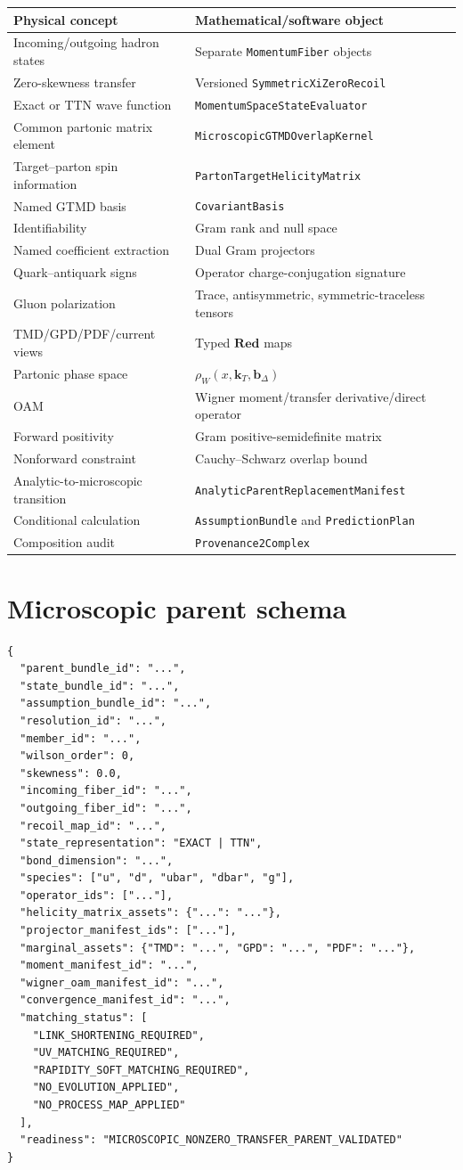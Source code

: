 \documentclass[11pt]{article}
\newcommand{\kT}{\bm{k}_{T}}
\newcommand{\bD}{\bm{b}_{\Delta}}
\newcommand{\AssumptionBundle}{\texttt{AssumptionBundle}}
\newcommand{\PredictionPlan}{\texttt{PredictionPlan}}
\newcommand{\MomentumFiber}{\texttt{MomentumFiber}}
\newcommand{\RecoilMap}{\texttt{SymmetricXiZeroRecoil}}
\newcommand{\StateEvaluator}{\texttt{MomentumSpaceStateEvaluator}}
\newcommand{\OverlapKernel}{\texttt{MicroscopicGTMDOverlapKernel}}
\newcommand{\HelicityMatrix}{\texttt{PartonTargetHelicityMatrix}}
\newcommand{\ReplacementManifest}{\texttt{AnalyticParentReplacementManifest}}
\newcommand{\ProvComplex}{\texttt{Provenance2Complex}}
\newcommand{\Red}{\mathbf{Red}}
\begin{document}
\begin{tabularx}{\textwidth}{L{0.30\textwidth}Y}
\toprule
Physical concept & Mathematical/software object\\
\midrule
Incoming/outgoing hadron states & Separate \MomentumFiber{} objects\\
Zero-skewness transfer & Versioned \RecoilMap{}\\
Exact or TTN wave function & \StateEvaluator{}\\
Common partonic matrix element & \OverlapKernel{}\\
Target--parton spin information & \HelicityMatrix{}\\
Named GTMD basis & \texttt{CovariantBasis}\\
Identifiability & Gram rank and null space\\
Named coefficient extraction & Dual Gram projectors\\
Quark--antiquark signs & Operator charge-conjugation signature\\
Gluon polarization & Trace, antisymmetric, symmetric-traceless tensors\\
TMD/GPD/PDF/current views & Typed \(\Red\) maps\\
Partonic phase space & \(\rho_W(x,\kT,\bD)\)\\
OAM & Wigner moment/transfer derivative/direct operator\\
Forward positivity & Gram positive-semidefinite matrix\\
Nonforward constraint & Cauchy--Schwarz overlap bound\\
Analytic-to-microscopic transition & \ReplacementManifest{}\\
Conditional calculation & \AssumptionBundle{} and \PredictionPlan{}\\
Composition audit & \ProvComplex{}\\
\bottomrule
\end{tabularx}

\section{Microscopic parent schema}

\begin{verbatim}
{
  "parent_bundle_id": "...",
  "state_bundle_id": "...",
  "assumption_bundle_id": "...",
  "resolution_id": "...",
  "member_id": "...",
  "wilson_order": 0,
  "skewness": 0.0,
  "incoming_fiber_id": "...",
  "outgoing_fiber_id": "...",
  "recoil_map_id": "...",
  "state_representation": "EXACT | TTN",
  "bond_dimension": "...",
  "species": ["u", "d", "ubar", "dbar", "g"],
  "operator_ids": ["..."],
  "helicity_matrix_assets": {"...": "..."},
  "projector_manifest_ids": ["..."],
  "marginal_assets": {"TMD": "...", "GPD": "...", "PDF": "..."},
  "moment_manifest_id": "...",
  "wigner_oam_manifest_id": "...",
  "convergence_manifest_id": "...",
  "matching_status": [
    "LINK_SHORTENING_REQUIRED",
    "UV_MATCHING_REQUIRED",
    "RAPIDITY_SOFT_MATCHING_REQUIRED",
    "NO_EVOLUTION_APPLIED",
    "NO_PROCESS_MAP_APPLIED"
  ],
  "readiness": "MICROSCOPIC_NONZERO_TRANSFER_PARENT_VALIDATED"
}
\end{verbatim}
\end{document}
